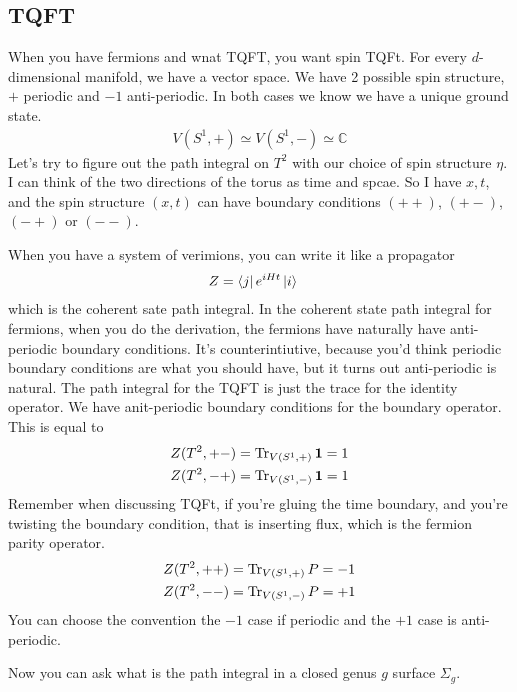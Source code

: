\subsection{TQFT}
When you have fermions and wnat TQFT,
you want spin TQFt.
For every $d$-dimensional manifold,
we have a vector space.
We have 2 possible spin structure, $+$ periodic and $-1$ anti-periodic.
In both cases we know we have a unique ground state.
\begin{align}
    V(S^1, +)
    \simeq
    V(S^1,-)
    \simeq\mathbb{C}
\end{align}
Let's try to figure out the path integral on $T^2$
with our choice of spin structure $\eta$.
I can think of the two directions of the torus as time and spcae.
So I have $x,t$,
and the spin structure $(x,t)$
can have boundary conditions $(++)$, $(+-)$, $(-+)$ or $(--)$.

When you have a system of verimions,
you can write it like a propagator
\begin{align}
    Z &= \bra{j} e^{iHt} \ket{i}
\end{align}
which is the coherent sate path integral.
In the coherent state path integral for fermions,
when you do the derivation,
the fermions have naturally have anti-periodic boundary conditions.
It's counterintiutive,
because you'd think periodic boundary conditions are what you should have,
but it turns out anti-periodic is natural.
The path integral for the TQFT is just the trace for the identity operator.
We have anit-periodic boundary conditions for the boundary operator.
This is equal to
\begin{align}
    Z(T^2, +-) &= \Tr_{V(S^1,+)}\mathbf{1} = 1\\
    Z(T^2, -+) &= \Tr_{V(S^1,-)}\mathbf{1} = 1
\end{align}
Remember when discussing TQFt,
if you're gluing the time boundary,
and you're twisting the boundary condition,
that is inserting flux,
which is the fermion parity operator.
\begin{align}
    Z(T^2, ++) &= \Tr_{V(S^1,+)}P = -1\\
    Z(T^2, --) &= \Tr_{V(S^1,-)}P = +1
\end{align}
You can choose the convention the $-1$ case if periodic and the $+1$ case is
anti-periodic.

Now you can ask what is the path integral in a closed genus $g$ surface
$\Sigma_g$.

